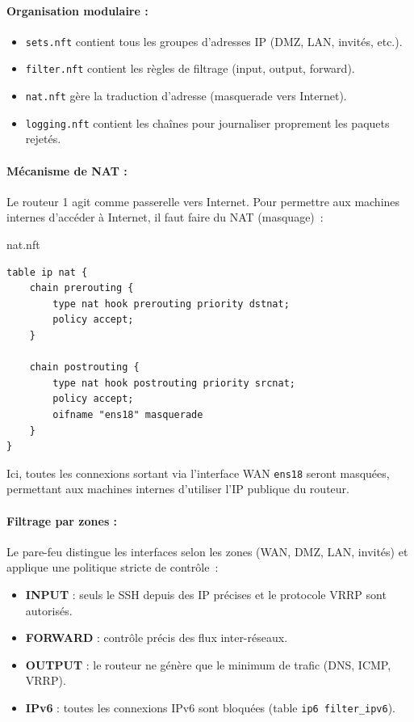 \documentclass{article}
\begin{document}
\paragraph{Organisation modulaire :}
\begin{itemize}
  \item \texttt{sets.nft} contient tous les groupes d'adresses IP (DMZ, LAN, invités, etc.).
  \item \texttt{filter.nft} contient les règles de filtrage (input, output, forward).
  \item \texttt{nat.nft} gère la traduction d'adresse (masquerade vers Internet).
  \item \texttt{logging.nft} contient les chaînes pour journaliser proprement les paquets rejetés.
\end{itemize}

\paragraph{Mécanisme de NAT :}

Le routeur 1 agit comme passerelle vers Internet. Pour permettre aux machines internes d'accéder à Internet, il faut faire du NAT (masquage)~:

\begin{configbox}{nat.nft}
\begin{lstlisting}
table ip nat {
    chain prerouting {
        type nat hook prerouting priority dstnat;
        policy accept;
    }

    chain postrouting {
        type nat hook postrouting priority srcnat;
        policy accept;
        oifname "ens18" masquerade
    }
}
\end{lstlisting}
\end{configbox}

Ici, toutes les connexions sortant via l'interface WAN \texttt{ens18} seront masquées, permettant aux machines internes d’utiliser l’IP publique du routeur.

\paragraph{Filtrage par zones :}

Le pare-feu distingue les interfaces selon les zones (WAN, DMZ, LAN, invités) et applique une politique stricte de contrôle~:

\begin{itemize}
    \item \textbf{INPUT} : seuls le SSH depuis des IP précises et le protocole VRRP sont autorisés.
    \item \textbf{FORWARD} : contrôle précis des flux inter-réseaux.
    \item \textbf{OUTPUT} : le routeur ne génère que le minimum de trafic (DNS, ICMP, VRRP).
    \item \textbf{IPv6} : toutes les connexions IPv6 sont bloquées (table \texttt{ip6 filter\_ipv6}).
\end{itemize}
\end{document}

